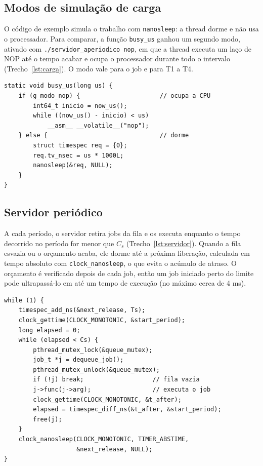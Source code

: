 \documentclass[conference,a4paper]{IEEEtran}
\begin{document}
\subsection{Modos de simulação de carga}\label{sec:modos}
O código de exemplo simula o trabalho com \texttt{nanosleep}: a thread dorme e não usa o processador. Para comparar, a função \texttt{busy\_us} ganhou um segundo modo, ativado com \texttt{./servidor\_aperiodico nop}, em que a thread executa um laço de NOP até o tempo acabar e ocupa o processador durante todo o intervalo (Trecho~\ref{lst:carga}). O modo vale para o job e para T1 a T4.

\begin{lstlisting}[caption={Simulação de carga nos dois modos.},label={lst:carga}]
static void busy_us(long us) {
    if (g_modo_nop) {                      // ocupa a CPU
        int64_t inicio = now_us();
        while ((now_us() - inicio) < us)
            __asm__ __volatile__("nop");
    } else {                               // dorme
        struct timespec req = {0};
        req.tv_nsec = us * 1000L;
        nanosleep(&req, NULL);
    }
}
\end{lstlisting}

\subsection{Servidor periódico}
A cada período, o servidor retira jobs da fila e os executa enquanto o tempo decorrido no período for menor que $C_s$ (Trecho~\ref{lst:servidor}). Quando a fila esvazia ou o orçamento acaba, ele dorme até a próxima liberação, calculada em tempo absoluto com \texttt{clock\_nanosleep}, o que evita o acúmulo de atraso. O orçamento é verificado depois de cada job, então um job iniciado perto do limite pode ultrapassá-lo em até um tempo de execução (no máximo cerca de 4 ms).

\begin{lstlisting}[caption={Laço principal do servidor.},label={lst:servidor}]
while (1) {
    timespec_add_ns(&next_release, Ts);
    clock_gettime(CLOCK_MONOTONIC, &start_period);
    long elapsed = 0;
    while (elapsed < Cs) {
        pthread_mutex_lock(&queue_mutex);
        job_t *j = dequeue_job();
        pthread_mutex_unlock(&queue_mutex);
        if (!j) break;                   // fila vazia
        j->func(j->arg);                 // executa o job
        clock_gettime(CLOCK_MONOTONIC, &t_after);
        elapsed = timespec_diff_ns(&t_after, &start_period);
        free(j);
    }
    clock_nanosleep(CLOCK_MONOTONIC, TIMER_ABSTIME,
                    &next_release, NULL);
}
\end{lstlisting}
\end{document}

